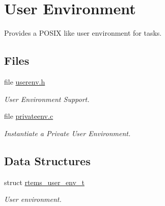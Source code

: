 \hypertarget{group__LibIOEnv}{}\section{User Environment}
\label{group__LibIOEnv}


Provides a P\+O\+S\+IX like user environment for tasks.  


\subsection*{Files}
\begin{DoxyCompactItemize}
\item 
file \mbox{\hyperlink{userenv_8h}{userenv.\+h}}
\begin{DoxyCompactList}\small\item\em User Environment Support. \end{DoxyCompactList}\item 
file \mbox{\hyperlink{privateenv_8c}{privateenv.\+c}}
\begin{DoxyCompactList}\small\item\em Instantiate a Private User Environment. \end{DoxyCompactList}\end{DoxyCompactItemize}
\subsection*{Data Structures}
\begin{DoxyCompactItemize}
\item 
struct \mbox{\hyperlink{structrtems__user__env__t}{rtems\+\_\+user\+\_\+env\+\_\+t}}
\begin{DoxyCompactList}\small\item\em User environment. \end{DoxyCompactList}\end{DoxyCompactItemize}

